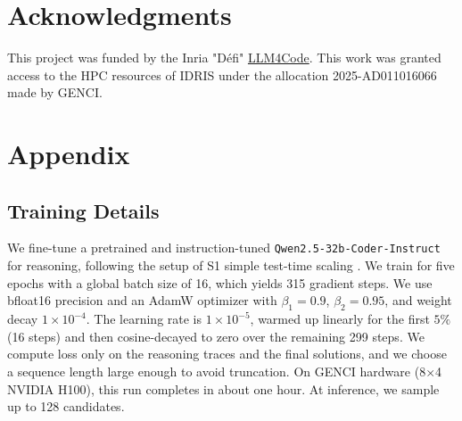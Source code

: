 \documentclass{article}
\begin{document}
\section{Acknowledgments}

This project was funded by the Inria "Défi" \href{https://project.inria.fr/llm4code/}{LLM4Code}.
This work was granted access to the HPC resources of IDRIS under the allocation 2025-AD011016066 made by GENCI.





\newpage

\appendix

\section{Appendix}


\subsection{Training Details}
\label{app:training}
We fine-tune a pretrained and instruction-tuned \texttt{Qwen2.5-32b-Coder-Instruct}\cite{deepseek2024} for reasoning, following the setup of S1 simple test-time scaling \cite{s12025}. We train for five epochs with a global batch size of 16, which yields 315 gradient steps. We use bfloat16 precision and an AdamW optimizer with $\beta_1=0.9$, $\beta_2=0.95$, and weight decay $1\times 10^{-4}$. The learning rate is $1\times 10^{-5}$, warmed up linearly for the first $5\%$ (16 steps) and then cosine-decayed to zero over the remaining 299 steps. We compute loss only on the reasoning traces and the final solutions, and we choose a sequence length large enough to avoid truncation. On GENCI hardware (8$\times$4 NVIDIA H100), this run completes in about one hour.
At inference, we sample up to 128 candidates.
\end{document}
